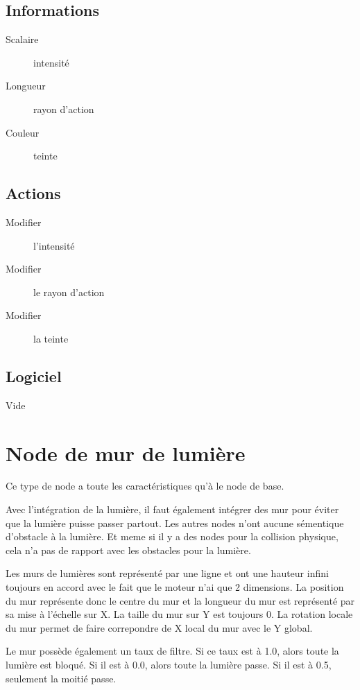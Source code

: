 \documentclass[11pt, a4paper]{article}
\begin{document}
\subsection{Informations}
\begin{description}
\item[Scalaire] intensité
\item[Longueur] rayon d'action
\item[Couleur] teinte
\end{description}

\subsection{Actions}
\begin{description}
\item[Modifier] l'intensité
\item[Modifier] le rayon d'action
\item[Modifier] la teinte
\end{description}

\subsection{Logiciel}
Vide

\section{Node de mur de lumière}
Ce type de node a toute les caractéristiques qu'à le node de base.

Avec l'intégration de la lumière, il faut également intégrer des mur pour éviter que la lumière puisse passer partout. Les autres nodes n'ont aucune sémentique d'obstacle à la lumière. Et meme si il y a des nodes pour la collision physique, cela n'a pas de rapport avec les obstacles pour la lumière.

Les murs de lumières sont représenté par une ligne et ont une hauteur infini toujours en accord avec le fait que le moteur n'ai que 2 dimensions.
La position du mur représente donc le centre du mur et la longueur du mur est représenté par sa mise à l'échelle sur X. La taille du mur sur Y est toujours 0.
La rotation locale du mur permet de faire correpondre de X local du mur avec le Y global.

Le mur possède également un taux de filtre. Si ce taux est à 1.0, alors toute la lumière est bloqué. Si il est à 0.0, alors toute la lumière passe. Si il est à 0.5, seulement la moitié passe.
\end{document}
